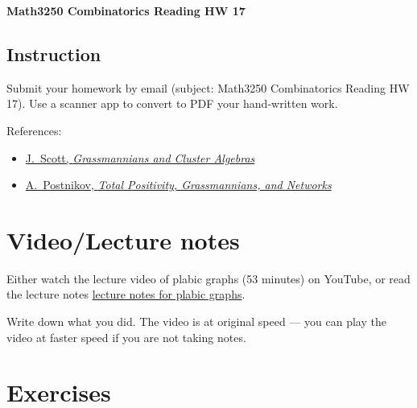 \documentclass[12pt]{amsart}
\begin{document}
\begin{center}\textbf{Math3250 Combinatorics Reading HW 17}\end{center}




\subsection*{Instruction}


Submit your homework by email (subject: Math3250 Combinatorics Reading HW 17). Use a scanner app to convert to PDF your hand-written work. 

References:
\begin{itemize}
	\item 
\href{https://arxiv.org/abs/math/0311148}{J.~Scott, \emph{Grassmannians and Cluster Algebras}}
\item 
\href{https://math.mit.edu/~apost/papers/tpgrass.pdf}{A.~Postnikov, \emph{Total Positivity, Grassmannians, and Networks}}
\end{itemize}





\section*{Video/Lecture notes}
Either watch the lecture video of plabic graphs (53 minutes) on YouTube, or read the lecture notes \href{https://egunawan.github.io/combinatorics/notes/notes_plabic_graphs.pdf}{lecture notes for plabic graphs}. 

Write down what you did. 
The video is at original speed --- you can play the video at faster speed if you are not taking notes.




\section*{Exercises}
\end{document}
